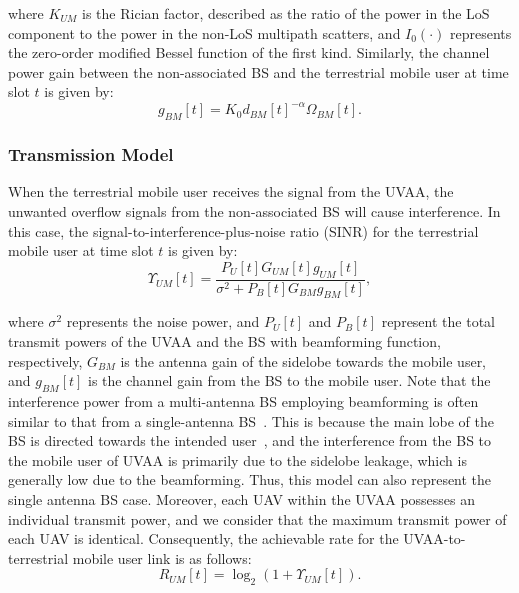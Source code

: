 \documentclass[10pt,journal,compsoc]{IEEEtran}
\begin{document}
\noindent where $K_{UM}$ is the Rician factor, described as the ratio of the power in the LoS component to the power in the non-LoS multipath scatters, and $I_0(\cdot)$ represents the zero-order modified Bessel function of the first kind. Similarly, the channel power gain between the non-associated BS and the terrestrial mobile user at time slot $t$ is given by:
\begin{equation}
    g_{BM}[t] = K_0 d_{BM}[t]^{-\alpha} \Omega_{BM}[t].
\end{equation}

\subsubsection{Transmission Model}

\par When the terrestrial mobile user receives the signal from the UVAA, the unwanted overflow signals from the non-associated BS will cause interference. In this case, the signal-to-interference-plus-noise ratio (SINR) for the terrestrial mobile user at time slot $t$ is given by:
\begin{equation}
\label{eq:SINR}
\Upsilon_{UM}[t] = \frac{P_U[t] G_{UM}[t] g_{UM}[t]}{\sigma^2 + P_B[t] G_{BM} g_{BM}[t]},
\end{equation}

\noindent where $\sigma^2$ represents the noise power, and $P_U[t]$ and $P_B[t]$ represent the total transmit powers of the UVAA and the BS with beamforming function, respectively, $G_{BM}$ is the antenna gain of the sidelobe towards the mobile user, and $g_{BM}[t]$ is the channel gain from the BS to the mobile user. Note that the interference power from a multi-antenna BS employing beamforming is often similar to that from a single-antenna BS~\cite{Dahrouj2010}. This is because the main lobe of the BS is directed towards the intended user~\cite{Javed2023}, and the interference from the BS to the mobile user of UVAA is primarily due to the sidelobe leakage, which is generally low due to the beamforming. Thus, this model can also represent the single antenna BS case. Moreover, each UAV within the UVAA possesses an individual transmit power, and we consider that the maximum transmit power of each UAV is identical. Consequently, the achievable rate for the UVAA-to-terrestrial mobile user link is as follows:
\begin{equation} 
\label{eq:rate}
    R_{UM}[t] = \log_2(1 + \Upsilon_{UM}[t]). 
\end{equation}
\end{document}
